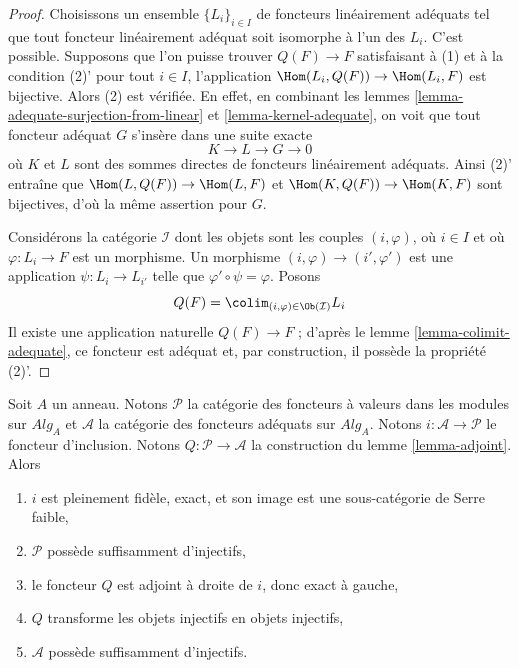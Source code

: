 \begin{proof}
Choisissons un ensemble $\{L_i\}_{i \in I}$ de foncteurs linéairement adéquats tel que
tout foncteur linéairement adéquat soit isomorphe à l'un des $L_i$.
C'est possible. Supposons que l'on puisse trouver $Q(F) \to F$ satisfaisant à (1) et à la condition
(2)' pour tout $i \in I$, l'application $\Hom(L_i, Q(F)) \to \Hom(L_i, F)$
est bijective. Alors (2) est vérifiée. En effet, en combinant les
lemmes \ref{lemma-adequate-surjection-from-linear} et
\ref{lemma-kernel-adequate},
on voit que tout foncteur adéquat $G$ s'insère dans une suite exacte
$$
K \to L \to G \to 0
$$
où $K$ et $L$ sont des sommes directes de foncteurs linéairement adéquats. Ainsi (2)'
entraîne que
$\Hom(L, Q(F)) \to \Hom(L, F)$
et
$\Hom(K, Q(F)) \to \Hom(K, F)$
sont bijectives, d'où la même assertion pour $G$.

\medskip\noindent
Considérons la catégorie $\mathcal{I}$ dont les objets sont les couples
$(i, \varphi)$, où $i \in I$ et où $\varphi : L_i \to F$ est un morphisme.
Un morphisme $(i, \varphi) \to (i', \varphi')$ est une application
$\psi : L_i \to L_{i'}$ telle que $\varphi' \circ \psi = \varphi$.
Posons
$$
Q(F) = \colim_{(i, \varphi) \in \Ob(\mathcal{I})} L_i
$$
Il existe une application naturelle $Q(F) \to F$ ; d'après le
lemme \ref{lemma-colimit-adequate},
ce foncteur est adéquat et, par construction, il possède la propriété (2)'.
\end{proof}

\begin{lemma}
\label{lemma-enough-injectives}
Soit $A$ un anneau. Notons $\mathcal{P}$ la catégorie des foncteurs à valeurs
dans les modules sur $\textit{Alg}_A$ et $\mathcal{A}$ la catégorie des foncteurs
adéquats sur $\textit{Alg}_A$. Notons $i : \mathcal{A} \to \mathcal{P}$
le foncteur d'inclusion. Notons $Q : \mathcal{P} \to \mathcal{A}$
la construction du lemme \ref{lemma-adjoint}.
Alors
\begin{enumerate}
\item $i$ est pleinement fidèle, exact, et son image est une sous-catégorie de Serre faible,
\item $\mathcal{P}$ possède suffisamment d'injectifs,
\item le foncteur $Q$ est adjoint à droite de $i$, donc exact à gauche,
\item $Q$ transforme les objets injectifs en objets injectifs,
\item $\mathcal{A}$ possède suffisamment d'injectifs.
\end{enumerate}
\end{lemma}

